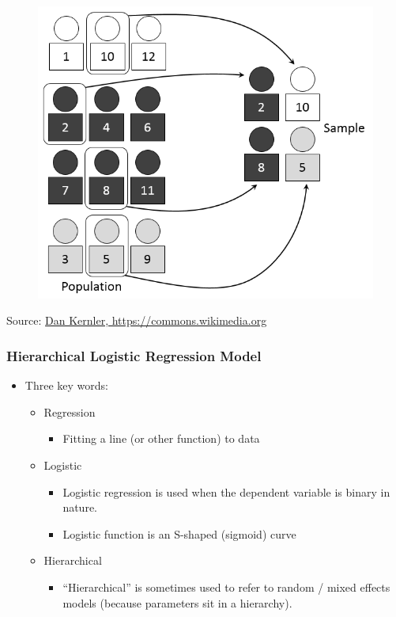 \documentclass{beamer}
\begin{document}
		\begin{frame}
			\centering
			\begin{figure}
				\includegraphics[width=0.7\linewidth]{img/stratified-sampling}
				\label{fig:stratifiedsampling}
			\end{figure}
		\tiny Source: \href{https://commons.wikimedia.org/wiki/File:Stratified\_sampling.PNG}{Dan Kernler, https://commons.wikimedia.org} 
		\end{frame}
		\begin{frame}
			\frametitle{Hierarchical Logistic Regression Model}
				\begin{itemize}
					\item Three key words:
					\begin{itemize}
						\item Regression
							\begin{itemize}
								\item Fitting a line (or other function) to data
							\end{itemize}
						\item Logistic
						\begin{itemize}
							\item  Logistic regression is used when the dependent variable is binary  in nature.
							\item Logistic function is an S-shaped (sigmoid) curve 
						\end{itemize}
						\item Hierarchical
							\begin{itemize}
								 \item ``Hierarchical'' is sometimes used to refer to random / mixed effects models (because parameters sit in a hierarchy).
							\end{itemize}
					\end{itemize}
				\end{itemize}
		\end{frame}
\end{document}
